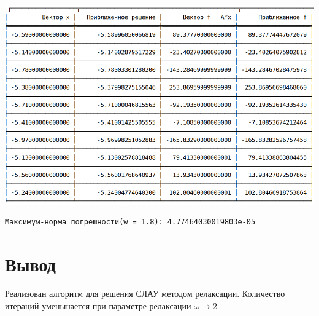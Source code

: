 \documentclass[12pt, a4paper]{report}
\begin{document}
\begin{center}
\centering
\includegraphics[scale=0.4]{images/Selection_001.png}
\end{center}
\begin{verbatim}
Максимум-норма погрешности(w = 1.8): 4.77464030019803e-05
\end{verbatim}
\section{Вывод}
Реализован алгоритм для решения СЛАУ методом релаксации.
Количество итераций уменьшается при параметре релаксации $\omega \longrightarrow 2$
\end{document}
